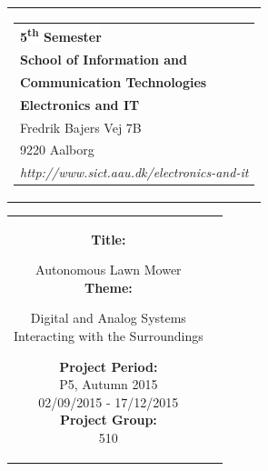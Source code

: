 % 
\thispagestyle{empty}
\begin{titlepage}
\begin{nopagebreak}
{\samepage 

\begin{tabular}{r}
\parbox{\textwidth}{  
\hfill \hspace{2cm} \parbox{8cm}{\begin{tabular}{l} %
{\small \textbf{\textcolor{aaublue}{\colorbox{white}{5\textsuperscript{th} Semester}}}}\\
{\small \textbf{\textcolor{aaublue}{School of Information and}}}\\
{\small \textbf{\textcolor{aaublue}{Communication Technologies}}}\\ 
{\small \textbf{\textcolor{aaublue}{Electronics and IT}}}\\
{\small \textcolor{aaublue}{Fredrik Bajers Vej 7B}} \\
{\small \textcolor{aaublue}{9220 Aalborg}} \\
{\small \textcolor{aaublue}{\emph{http://www.sict.aau.dk/electronics-and-it}}}
\end{tabular}}}
\end{tabular}

\begin{tabular}{cc}
\parbox{7cm}{

\textbf{Title:}

Autonomous Lawn Mower\\ %

\textbf{Theme:} 

\small{
Digital and Analog Systems\\
Interacting with the Surroundings\\
}


\parbox{8cm}{


\textbf{Project Period:}\\
P5, Autumn 2015\\
02/09/2015 - 17/12/2015\\
   
\textbf{Project Group:}\\
510\\ %
  
}}
\end{tabular}}
\end{nopagebreak}
\end{titlepage}
